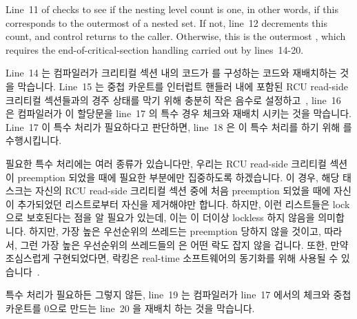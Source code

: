 Line~11 of  checks to see if the nesting level count
is one, in other words, if this corresponds to the outermost
 of a nested set.
If not, line~12 decrements this count, and control returns to the caller.
Otherwise, this is the outermost , which requires
the end-of-critical-section handling carried out by lines~14-20.
\fi

Line~14 는 컴파일러가 크리티컬 섹션 내의 코드가  를
구성하는 코드와 재배치하는 것을 막습니다.
Line~15 는 중첩 카운트를 인터럽트 핸들러 내에 포함된 RCU read-side 크리티컬
섹션들과의 경주 상태를 막기 위해 충분히 작은 음수로
설정하고~\cite{PaulEMcKenney2011RCU3.0trainwreck}, line~16 은 컴파일러가 이
할당문을 line~17 의 특수 경우 체크와 재배치 시키는 것을 막습니다.
Line~17 이 특수 처리가 필요하다고 판단하면, line~18 은 이 특수 처리를 하기 위해
 를 수행시킵니다.

필요한 특수 처리에는 여러 종류가 있습니다만, 우리는 RCU read-side 크리티컬
섹션이 preemption 되었을 때에 필요한 부분에만 집중하도록 하겠습니다.
이 경우, 해당 태스크는 자신의 RCU read-side 크리티컬 섹션 중에 처음 preemption
되었을 때에 자신이 추가되었던 리스트로부터 자신을 제거해야만 합니다.
하지만, 이런 리스트들은 lock 으로 보호된다는 점을 알 필요가 있는데, 이는
 이 더이상 lockless 하지 않음을 의미합니다.
하지만, 가장 높은 우선순위의 쓰레드는 preemption 당하지 않을 것이고, 따라서,
그런 가장 높은 우선순위의 쓰레드들의  은 어떤 락도 잡지
않을 겁니다.
또한, 만약 조심스럽게 구현되었다면, 락킹은 real-time 소프트웨어의 동기화를 위해
사용될 수 있습니다~\cite{BjoernBrandenburgPhD}.

특수 처리가 필요하든 그렇지 않든, line~19 는 컴파일러가 line~17 에서의 체크와
중첩 카운트를 0으로 만드는 line~20 을 재배치 하는 것을 막습니다.
\iffalse

